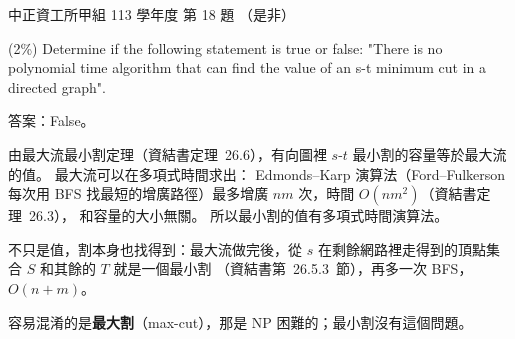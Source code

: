 \begin{pastexam}[label={px:ccu-113-swa-13}]{中正資工所甲組 113 學年度 第 18 題}
（是非）

(2\%) Determine if the following statement is true or false: "There is no polynomial time algorithm that can find the value of an s-t minimum cut in a directed graph".
\end{pastexam}

\begin{pastsoln}
答案：False。

由最大流最小割定理（資結書定理~26.6），有向圖裡 $s$-$t$ 最小割的容量等於最大流的值。 最大流可以在多項式時間求出：
Edmonds--Karp 演算法（Ford--Fulkerson 每次用 BFS 找最短的增廣路徑）最多增廣 $nm$ 次，時間 $O(nm^2)$（資結書定理~26.3），
和容量的大小無關。 所以最小割的值有多項式時間演算法。

不只是值，割本身也找得到：最大流做完後，從 $s$ 在剩餘網路裡走得到的頂點集合 $S$ 和其餘的 $T$ 就是一個最小割
（資結書第~26.5.3~節），再多一次 BFS，$O(n + m)$。

容易混淆的是\textbf{最大割}（max-cut），那是 NP 困難的；最小割沒有這個問題。
\end{pastsoln}
